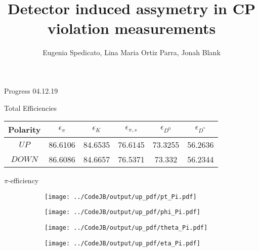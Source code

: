 \documentclass[11pt]{beamer}
\author{Eugenia Spedicato, Lina Maria Ortiz Parra, Jonah Blank}
\title{Detector induced assymetry in CP violation measurements}
\begin{document}
\begin{frame}
\titlepage
\end{frame}


\begin{frame}
\begin{LARGE}
Progress 04.12.19
\end{LARGE}
\end{frame}
\begin{frame}{Total Efficiencies}
\begin{table}
	\begin{tabular}{cS[table-format=2.4]S[table-format=2.4]S[table-format=2.4]S[table-format=2.4]S[table-format=2.4]}
		\toprule
		{Polarity} & {$\epsilon_{\pi} $} & {$\epsilon_{K} $} & {$ \epsilon_{\pi,s} $} & {$\epsilon_{D^0} $} & {$\epsilon_{D^*} $} \\
		\midrule
		$UP$ & 86.6106 & 84.6535 & 76.6145 & 73.3255 & 56.2636 \\
		$DOWN$ & 86.6086 & 84.6657 & 76.5371 & 73.332 & 56.2344 \\
		\bottomrule
	\end{tabular}
\end{table}
\end{frame}
\begin{frame}{$\pi$-efficiency}
\begin{figure}
\begin{subfigure}{0.45\textwidth}
\texttt{[image: ../CodeJB/output/up\_pdf/pt\_Pi.pdf]}
\end{subfigure}
\begin{subfigure}{0.45\textwidth}
\texttt{[image: ../CodeJB/output/up\_pdf/phi\_Pi.pdf]}
\end{subfigure}
\begin{subfigure}{0.45\textwidth}
\texttt{[image: ../CodeJB/output/up\_pdf/theta\_Pi.pdf]}
\end{subfigure}
\begin{subfigure}{0.45\textwidth}
\texttt{[image: ../CodeJB/output/up\_pdf/eta\_Pi.pdf]}
\end{subfigure}
\end{figure}
\end{frame}
\end{document}
